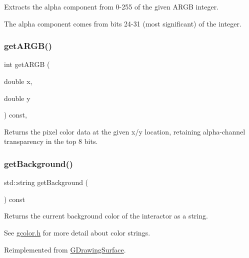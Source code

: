 Extracts the alpha component from 0-\/255 of the given A\+R\+GB integer. 

The alpha component comes from bits 24-\/31 (most significant) of the integer. \mbox{\label{classGDrawingSurface_ae394d39f20476570e083918d991c25bd}} 
\subsubsection{\texorpdfstring{get\+A\+R\+G\+B()}{getARGB()}}
{\footnotesize\ttfamily int get\+A\+R\+GB (\begin{DoxyParamCaption}\item[{double}]{x,  }\item[{double}]{y }\end{DoxyParamCaption}) const\hspace{0.3cm}{\ttfamily [virtual]}, {\ttfamily [inherited]}}



Returns the pixel color data at the given x/y location, retaining alpha-\/channel transparency in the top 8 bits. 

\mbox{\label{classGCanvas_ab44f928b6bd7c8e4b82d5ed92bc3d4c6}} 
\subsubsection{\texorpdfstring{get\+Background()}{getBackground()}}
{\footnotesize\ttfamily std\+::string get\+Background (\begin{DoxyParamCaption}{ }\end{DoxyParamCaption}) const\hspace{0.3cm}{\ttfamily [virtual]}}



Returns the current background color of the interactor as a string. 

See \mbox{\hyperlink{gcolor_8h_source}{gcolor.\+h}} for more detail about color strings. 

Reimplemented from \mbox{\hyperlink{classGDrawingSurface_a808e22cc1fdfbecf71ed8c64ef4600e0}{G\+Drawing\+Surface}}.

\mbox{\label{classGCanvas_af66f525e8154dbc8dcd2daecf3728ba9}} 
